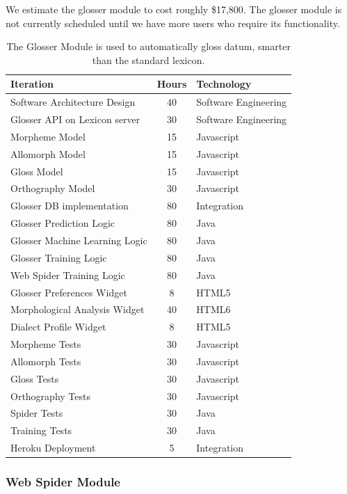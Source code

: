 \documentclass[12pt]{article}
\begin{document}
We estimate the glosser module to cost roughly \$17,800. The glosser module is not currently scheduled until we have more users who require its functionality.
\begin{table}[htbp]
\begin{center}
  \begin{tabular}{ | lcl | }
\hline

Iteration&  Hours&  Technology  \\
\hline
Software Architecture Design& 40& Software Engineering  \\ 
Glosser API on Lexicon server&  30& Software Engineering\\ 
Morpheme Model& 15& Javascript  \\ 
Allomorph Model&  15& Javascript  \\ 
Gloss Model&  15& Javascript  \\ 
Orthography Model&  30& Javascript  \\ 
Glosser DB implementation&  80& Integration \\ 
Glosser Prediction Logic& 80& Java  \\ 
Glosser Machine Learning Logic& 80& Java  \\ 
Glosser Training Logic& 80& Java  \\ 
Web Spider Training Logic&  80& Java  \\ 
Glosser Preferences Widget& 8&  HTML5 \\ 
Morphological Analysis Widget&  40& HTML6 \\ 
Dialect Profile Widget& 8&  HTML5 \\ 
Morpheme Tests& 30& Javascript  \\ 
Allomorph Tests&  30&  Javascript \\ 
Gloss Tests&           30&  Javascript \\ 
Orthography Tests&  30&  Javascript \\ 
Spider Tests& 30& Java \\ 
Training Tests& 30& Java  \\ 
Heroku Deployment&  5&  Integration \\ 
\hline
  \end{tabular}
   \caption{The Glosser Module is used to automatically gloss datum, smarter than the standard lexicon.}
  \label{tab:glosser}
  \end{center}
\end{table}

\subsubsection{Web Spider Module}
\end{document}
